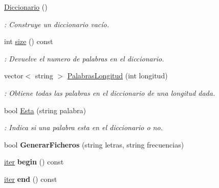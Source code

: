 \begin{DoxyCompactItemize}
\item 
\hyperlink{classDiccionario_aa0a2191ec706b256c35b5229cc197b15}{Diccionario} ()\hypertarget{classDiccionario_aa0a2191ec706b256c35b5229cc197b15}{}\label{classDiccionario_aa0a2191ec706b256c35b5229cc197b15}

\begin{DoxyCompactList}\small\item\em \+: Construye un diccionario vacío. \end{DoxyCompactList}\item 
int \hyperlink{classDiccionario_abe2e0023732c4cef7f6960120e8cde39}{size} () const 
\begin{DoxyCompactList}\small\item\em \+: Devuelve el numero de palabras en el diccionario. \end{DoxyCompactList}\item 
vector$<$ string $>$ \hyperlink{classDiccionario_a6ec8594ebcc112eea474ae1ff86629be}{Palabras\+Longitud} (int longitud)
\begin{DoxyCompactList}\small\item\em \+: Obtiene todas las palabras en el diccionario de una longitud dada. \end{DoxyCompactList}\item 
bool \hyperlink{classDiccionario_a2091d415bc53c34a0e78e7bd9b073024}{Esta} (string palabra)
\begin{DoxyCompactList}\small\item\em \+: Indica si una palabra esta en el diccionario o no. \end{DoxyCompactList}\item 
bool {\bfseries Generar\+Ficheros} (string letras, string frecuencias)\hypertarget{classDiccionario_a2835b073f7ed7a4e0f76ac26d8cc606e}{}\label{classDiccionario_a2835b073f7ed7a4e0f76ac26d8cc606e}

\item 
\hyperlink{classDiccionario_1_1iter}{iter} {\bfseries begin} () const \hypertarget{classDiccionario_a0a59b070ea0434b8a23afa77b0979d34}{}\label{classDiccionario_a0a59b070ea0434b8a23afa77b0979d34}

\item 
\hyperlink{classDiccionario_1_1iter}{iter} {\bfseries end} () const \hypertarget{classDiccionario_ac2a8812c73049c7ac557f7f34695da67}{}\label{classDiccionario_ac2a8812c73049c7ac557f7f34695da67}

\end{DoxyCompactItemize}

